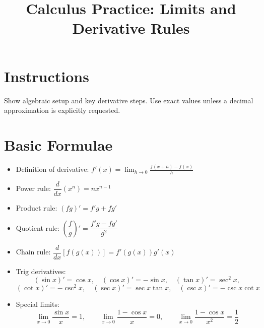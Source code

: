 \documentclass[12pt]{article}
\title{Calculus Practice: Limits and Derivative Rules}
\author{}
\date{}
\begin{document}
\maketitle

\section*{Instructions}
Show algebraic setup and key derivative steps. Use exact values unless a decimal approximation is explicitly requested.

\section*{Basic Formulae}
\begin{itemize}[leftmargin=1.5em]
  \item Definition of derivative: $f'(x)=\displaystyle \lim_{h\to 0}\frac{f(x+h)-f(x)}{h}$
  \item Power rule: $\dfrac{d}{dx}(x^n)=nx^{n-1}$
  \item Product rule: $(fg)'=f'g+fg'$
  \item Quotient rule: $\left(\dfrac{f}{g}\right)'=\dfrac{f'g-fg'}{g^2}$
  \item Chain rule: $\dfrac{d}{dx}[f(g(x))]=f'(g(x))g'(x)$
  \item Trig derivatives:
  \[
  (\sin x)'=\cos x,\quad (\cos x)'=-\sin x,\quad (\tan x)'=\sec^2 x,
  \]
  \[
  (\cot x)'=-\csc^2 x,\quad (\sec x)'=\sec x\tan x,\quad (\csc x)'=-\csc x\cot x
  \]
  \item Special limits:
  \[
  \lim_{x\to 0}\frac{\sin x}{x}=1,\qquad
  \lim_{x\to 0}\frac{1-\cos x}{x}=0,\qquad
  \lim_{x\to 0}\frac{1-\cos x}{x^2}=\frac12
  \]
\end{itemize}
\end{document}
